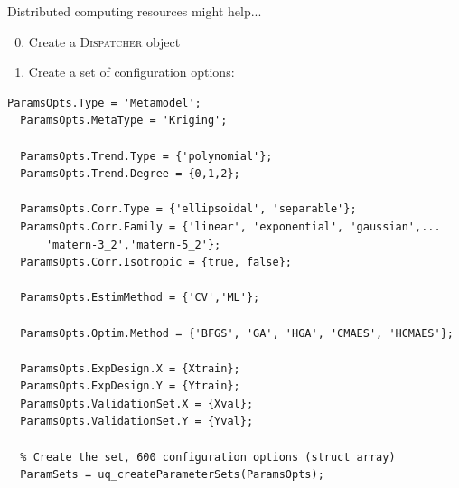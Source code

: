 \documentclass[]{rsuqbeamernew}
\begin{document}
  
  \begin{frame}[fragile]{Distributed computing resources might help...}
  
  \begin{enumerate}
    \setcounter{enumi}{-1}
    \item Create a \textsc{Dispatcher} object
    \item Create a set of configuration options:
  \end{enumerate}
  \begin{lstlisting}[basicstyle=\scriptsize,numbers=none]
  ParamsOpts.Type = 'Metamodel';
  ParamsOpts.MetaType = 'Kriging';
  
  ParamsOpts.Trend.Type = {'polynomial'};
  ParamsOpts.Trend.Degree = {0,1,2};
  
  ParamsOpts.Corr.Type = {'ellipsoidal', 'separable'};
  ParamsOpts.Corr.Family = {'linear', 'exponential', 'gaussian',...
      'matern-3_2','matern-5_2'};
  ParamsOpts.Corr.Isotropic = {true, false};
  
  ParamsOpts.EstimMethod = {'CV','ML'};
    
  ParamsOpts.Optim.Method = {'BFGS', 'GA', 'HGA', 'CMAES', 'HCMAES'};
    
  ParamsOpts.ExpDesign.X = {Xtrain};
  ParamsOpts.ExpDesign.Y = {Ytrain};
  ParamsOpts.ValidationSet.X = {Xval};
  ParamsOpts.ValidationSet.Y = {Yval};
  
  % Create the set, 600 configuration options (struct array)
  ParamSets = uq_createParameterSets(ParamsOpts); 
  \end{lstlisting}
  
  \end{frame}
  
\end{document}
